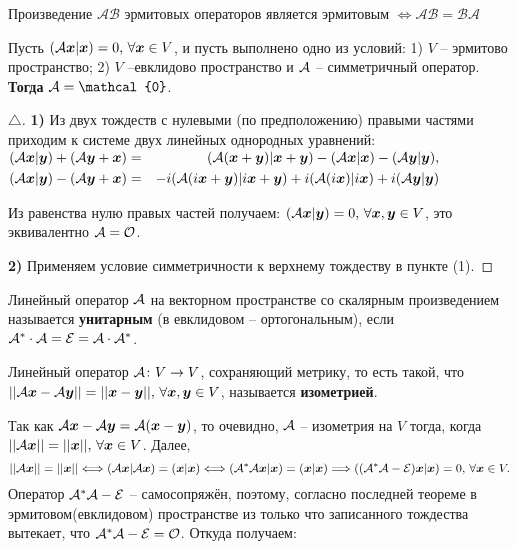\begin{to_thr} 
	Произведение $\mathcal{A B}$ эрмитовых операторов является эрмитовым $\Longleftrightarrow \mathcal{A B} = \mathcal{B A}$ 
\end{to_thr}

\begin{to_thr} 
	 Пусть $(\mathcal A \mbox{\boldmath $x$}|\mbox{\boldmath $x$}) = 0, \, \forall \mbox{\boldmath $x$} \in V$, и пусть выполнено одно из условий: 1) $V$ -- эрмитово пространство; 2) $V$ --евклидово пространство и $\mathcal A$ -- симметричный оператор.
	 \textbf{Тогда} $\A = \mathcal{0}$.
\end{to_thr}

\begin{proof}[$\triangle$]
	\textbf{1)} Из двух тождеств с нулевыми (по предположению) правыми частями приходим к системе двух линейных однородных уравнений:
	 $\begin{aligned}
	 	&(\mathcal A \mbox{\boldmath $x$} | \mbox{\boldmath $y$}) + (\mathcal A \mbox{\boldmath $y$}+\mbox{\boldmath $x$}) = &(\mathcal A (\mbox{\boldmath $x$} + \mbox{\boldmath $y$}) | \mbox{\boldmath $x$} + \mbox{\boldmath $y$}) - (\mathcal A \mbox{\boldmath $x$}|\mbox{\boldmath $x$}) - (\mathcal A \mbox{\boldmath $y$}|\mbox{\boldmath $y$}),\\
	 	&(\mathcal A \mbox{\boldmath $x$} | \mbox{\boldmath $y$}) - (\mathcal A \mbox{\boldmath $y$}+\mbox{\boldmath $x$}) = &- i(\mathcal A (i\mbox{\boldmath $x$} + \mbox{\boldmath $y$}) | i\mbox{\boldmath $x$} + \mbox{\boldmath $y$}) + i(\mathcal A (i\mbox{\boldmath $x$})|i \mbox{\boldmath $x$}) + i(\mathcal A \mbox{\boldmath $y$}|\mbox{\boldmath $y$})
	 \end{aligned}$

	 Из равенства нулю правых частей получаем: $(\mathcal A \mbox{\boldmath $x$}|\mbox{\boldmath $y$})= 0, \, \forall \mbox{\boldmath $x$}, \mbox{\boldmath $y$} \in V$, это эквивалентно $\mathcal A = \mathcal O$.

	 \textbf{2)} Применяем условие симметричности к верхнему тождеству в пункте (1).
\end{proof}


\begin{to_def} 
	Линейный оператор $\mathcal A$ на векторном пространстве со скалярным произведением называется \textbf{унитарным} (в евклидовом -- ортогональным), если $\mathcal A^* \cdot \mathcal A = \mathcal E = \mathcal A \cdot \mathcal A^*$.
\end{to_def}

\begin{to_def} 
	Линейный оператор $\mathcal A \colon V \to V$, сохраняющий метрику, то есть такой, что $||\mathcal A \mbox{\boldmath $x$} - \mathcal A \mbox{\boldmath $y$}|| = || \mbox{\boldmath $x$} - \mbox{\boldmath $y$}||, \, \forall \mbox{\boldmath $x$},\mbox{\boldmath $y$} \in V$, называется \textbf{изометрией}.
\end{to_def}

Так как $\mathcal A \mbox{\boldmath $x$} - \mathcal A \mbox{\boldmath $y$} = \mathcal A (\mbox{\boldmath $x$} - \mbox{\boldmath $y$})$, то очевидно, $\mathcal A$ -- изометрия на $V$ тогда, когда $||\mathcal A \mbox{\boldmath $x$}|| = ||\mbox{\boldmath $x$}||, \, \forall \mbox{\boldmath $x$} \in V$. 
Далее,
$$
||\mathcal A \mbox{\boldmath $x$}|| = ||\mbox{\boldmath $x$}|| \Longleftrightarrow (\mathcal A \mbox{\boldmath $x$}| \mathcal A \mbox{\boldmath $x$}) = (\mbox{\boldmath $x$}|\mbox{\boldmath $x$}) \Longleftrightarrow (\mathcal A^* \mathcal A \mbox{\boldmath $x$} | \mbox{\boldmath $x$}) = (\mbox{\boldmath $x$}|\mbox{\boldmath $x$}) \Longrightarrow ( (\mathcal A^* \mathcal A - \mathcal E) \mbox{\boldmath $x$} | \mbox{\boldmath $x$}) = 0, \, \forall \mbox{\boldmath $x$} \in V.
$$ 
Оператор $\mathcal A^* \mathcal A - \mathcal E$ -- самосопряжён, поэтому, согласно последней теореме в эрмитовом(евклидовом) пространстве из только что записанного тождества вытекает, что $\mathcal A^* \mathcal A - \mathcal E = \mathcal O$. Откуда получаем:

